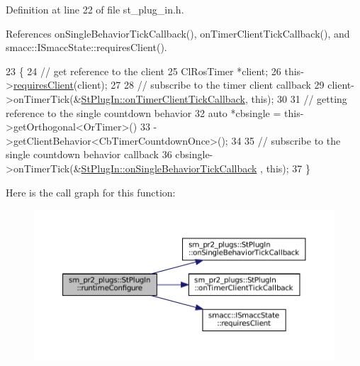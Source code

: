 Definition at line 22 of file st\+\_\+plug\+\_\+in.\+h.



References on\+Single\+Behavior\+Tick\+Callback(), on\+Timer\+Client\+Tick\+Callback(), and smacc\+::\+I\+Smacc\+State\+::requires\+Client().


\begin{DoxyCode}
23     \{
24         \textcolor{comment}{// get reference to the client}
25         ClRosTimer *client;
26         this->\hyperlink{classsmacc_1_1ISmaccState_a7f95c9f0a6ea2d6f18d1aec0519de4ac}{requiresClient}(client);
27 
28         \textcolor{comment}{// subscribe to the timer client callback}
29         client->onTimerTick(&\hyperlink{structsm__pr2__plugs_1_1StPlugIn_a1748462c4026a2df5be52e38a429560b}{StPlugIn::onTimerClientTickCallback}, \textcolor{keyword}{this});
30 
31         \textcolor{comment}{// getting reference to the single countdown behavior}
32         \textcolor{keyword}{auto} *cbsingle = this->getOrthogonal<OrTimer>()
33                              ->getClientBehavior<CbTimerCountdownOnce>();
34 
35         \textcolor{comment}{// subscribe to the single countdown behavior callback}
36         cbsingle->onTimerTick(&\hyperlink{structsm__pr2__plugs_1_1StPlugIn_a6206766ae01ea5ee0effe3f574245176}{StPlugIn::onSingleBehaviorTickCallback}
      , \textcolor{keyword}{this});
37     \}
\end{DoxyCode}
Here is the call graph for this function\+:
\nopagebreak
\begin{figure}[H]
\begin{center}
\leavevmode
\includegraphics[width=350pt]{structsm__pr2__plugs_1_1StPlugIn_a21411a3a1c4fa85a7bad312cf01b0d9a_cgraph}
\end{center}
\end{figure}
\mbox{\label{structsm__pr2__plugs_1_1StPlugIn_a9098d683bdfaed2a78da207828faa227}} 
